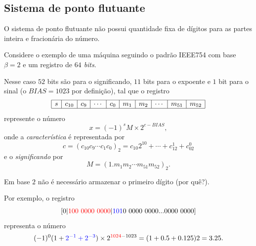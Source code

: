 \documentclass[main.tex]{subfiles}
\begin{document}
\subsection{Sistema de ponto flutuante}
O sistema de ponto flutuante não possui quantidade fixa de dígitos para as partes inteira e fracionária do número. 

\begin{ex} Considere o exemplo de uma máquina seguindo o padrão IEEE754 com base $\beta=2$ e um registro de \emph{$64$ bits}.

Nesse caso $52$ bits são para o significando, $11$ bits para o expoente e $1$ bit para o sinal (o $BIAS=1023$ por definição), tal que o registro
$$
\begin{array}{|c|c|c|c|c|c|c|c|c|c|}
\hline
s&c_{10}&c_{9}&\cdots&c_{0}&m_1&m_2&\cdots &m_{51}&m_{52}\\
\hline
\end{array}
$$
represente o número
$$ x=(-1)^{s}M \times 2^{c-BIAS}, $$
onde a \emph{característica} é representada por
$$c=(c_{10}c_9\cdots c_1c_0)_2
   =c_{10}2^{10}+\cdots+c_12^1+c_02^0 $$
e o \emph{significando} por
$$M=(1.m_1m_2\cdots m_{51}m_{52})_2.$$

Em base $2$ não é necessário armazenar o primeiro dígito (por quê?).

Por exemplo, o registro
$$
[0|{\color{red}{100~0000~0000}} |{\color{blue}{101}}0~0000~0000...0000~0000]
$$
representa o número
$$
(-1)^0(1+{\color{blue}{2^{-1}+2^{-3}}})\times  2^{{\color{red}{1024}}-1023}=(1+0.5+0.125)2=3.25.
$$
\end{ex}
\end{document}
